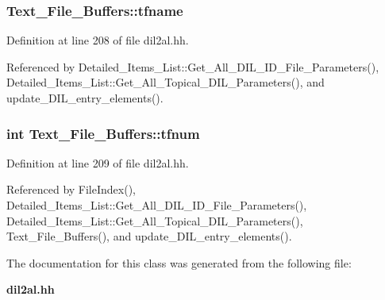 \subsubsection{ Text\_\-File\_\-Buffers::tfname}\label{classText__File__Buffers_m1}




Definition at line 208 of file dil2al.hh.

Referenced by Detailed\_\-Items\_\-List::Get\_\-All\_\-DIL\_\-ID\_\-File\_\-Parameters(), Detailed\_\-Items\_\-List::Get\_\-All\_\-Topical\_\-DIL\_\-Parameters(), and update\_\-DIL\_\-entry\_\-elements().
\subsubsection{\setlength{\rightskip}{0pt plus 5cm}int Text\_\-File\_\-Buffers::tfnum}\label{classText__File__Buffers_m2}




Definition at line 209 of file dil2al.hh.

Referenced by File\-Index(), Detailed\_\-Items\_\-List::Get\_\-All\_\-DIL\_\-ID\_\-File\_\-Parameters(), Detailed\_\-Items\_\-List::Get\_\-All\_\-Topical\_\-DIL\_\-Parameters(), Text\_\-File\_\-Buffers(), and update\_\-DIL\_\-entry\_\-elements().

The documentation for this class was generated from the following file:\begin{CompactItemize}
\item 
{\bf dil2al.hh}\end{CompactItemize}
